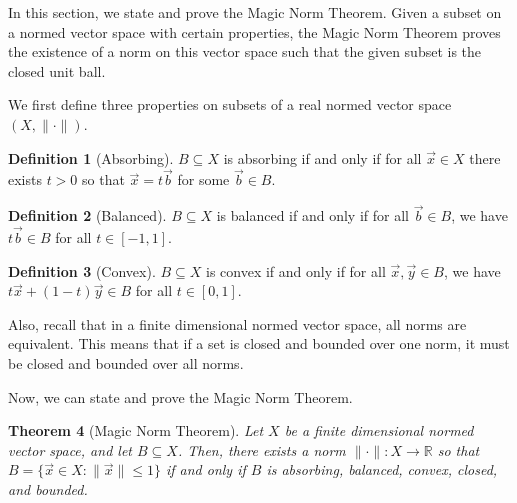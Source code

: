 \documentclass{article}
\newcommand{\R}{\mathbb{R}}
\theoremstyle{plain} %
\newtheorem{thm}{Theorem}
\numberwithin{thm}{section} %
\theoremstyle{definition} %
\newtheorem{defn}[thm]{Definition}
\begin{document}
In this section, we state and prove the Magic Norm Theorem. Given a subset on a normed vector space with certain properties, the Magic Norm Theorem proves the existence of a norm on this vector space such that the given subset is the closed unit ball.

We first define three properties on subsets of a real normed vector space $(X, \|\cdot\|)$.

\begin{defn}[Absorbing]
    \label{absorbing}
    $B \subseteq X$ is absorbing if and only if for all $\vec{x} \in X$ there exists $t > 0$ so that $\vec{x} = t\vec{b}$ for some $\vec{b} \in B$.
\end{defn}

\begin{defn}[Balanced]
    \label{balanced}
    $B \subseteq X$ is balanced if and only if for all $\vec{b} \in B$, we have $t\vec{b} \in B$ for all $t \in [-1, 1]$.
\end{defn}

\begin{defn}[Convex]
    \label{convex}
    $B \subseteq X$ is convex if and only if for all $\vec{x}, \vec{y} \in B$, we have $t\vec{x} + (1 - t)\vec{y} \in B$ for all $t \in [0, 1]$.
\end{defn}

Also, recall that in a finite dimensional normed vector space, all norms are equivalent. This means that if a set is closed and bounded over one norm, it must be closed and bounded over all norms.

Now, we can state and prove the Magic Norm Theorem.

\begin{thm}[Magic Norm Theorem]
    \label{Magic Norm Theorem}
    Let $X$ be a finite dimensional normed vector space, and let $B \subseteq X$. Then, there exists a norm $\|\cdot\|: X \to \R$ so that $B = \{\vec{x} \in X: \|\vec{x}\| \leq 1\}$ if and only if $B$ is absorbing, balanced, convex, closed, and bounded.
\end{thm}
\end{document}
